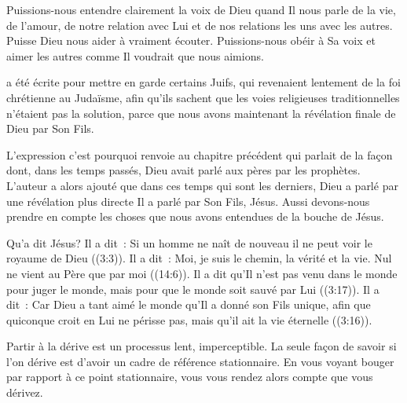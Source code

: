 Puissions-nous entendre clairement la voix de Dieu quand Il nous parle
 de la vie, de l'amour, de notre relation avec Lui et de nos relations
 les uns avec les autres. Puisse Dieu nous aider à vraiment écouter.
 Puissions-nous obéir à Sa voix et aimer les autres comme Il voudrait
 que nous aimions.

\dvrule






 a été écrite pour mettre en garde
 certains Juifs, qui revenaient lentement de la foi chrétienne au Judaïsme,
 afin qu'ils sachent que les voies religieuses traditionnelles
 n'étaient pas la solution, parce que nous avons maintenant
 la révélation finale de Dieu par Son Fils. 

L'expression \og c'est pourquoi \fg{} renvoie au chapitre précédent
 qui parlait de la façon dont, dans les temps passés,
 Dieu avait parlé aux pères par les prophètes.
 L'auteur a alors ajouté que dans ces temps qui sont les derniers,
 Dieu a parlé par une révélation plus directe
 \ocadr Il a parlé par Son Fils, Jésus.
 Aussi devons-nous prendre en compte les choses que nous avons entendues
 de la bouche de Jésus. 


Qu'a dit Jésus? Il a dit~: 
 \og Si un homme ne naît de nouveau il ne peut voir le royaume de Dieu \fg{}
 ((3:3)).
 Il a dit~: 
 \og Moi, je suis le chemin, la vérité et la vie.
 Nul ne vient au Père que par moi \fg{} ((14:6)).
 Il a dit qu'Il n'est pas venu \og dans le monde pour juger le monde,
 mais pour que le monde soit sauvé par Lui \fg{} ((3:17)).
 Il a dit~: 
 \og Car Dieu a tant aimé le monde qu'Il a donné son Fils unique,
 afin que quiconque croit en Lui ne périsse pas,
 mais qu'il ait la vie éternelle \fg{} ((3:16)). 

Partir à la dérive est un processus lent, imperceptible.
 La seule façon de savoir si l'on dérive est d'avoir un cadre de référence
 stationnaire.
 En vous voyant bouger par rapport à ce point stationnaire,
 vous vous rendez alors compte que vous dérivez. 

